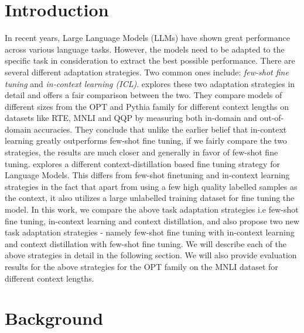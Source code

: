 \documentclass[10pt,twocolumn,letterpaper]{article}
\begin{document}
\section{Introduction}
In recent years, Large Language Models (LLMs) have shown great performance across various language tasks. However, the models need to be adapted to the specific task in consideration to extract the best possible performance. There are several different adaptation strategies. Two common ones include: \textit{few-shot fine tuning} and \textit{in-context learning (ICL)}. \cite {mosbach2023fewshot} explores these two adaptation strategies in detail and offers a fair comparison between the two. They compare models of different sizes from the OPT and Pythia family for different context lengths on datasets like RTE, MNLI and QQP by measuring both in-domain and out-of-domain accuracies. They conclude that unlike the earlier belief that in-context learning greatly outperforms few-shot fine tuning, if we fairly compare the two strategies, the results are much closer and generally in favor of few-shot fine tuning. \cite{askell2021general} explores a different context-distillation based fine tuning strategy for Language Models. This differs from few-shot finetuning and in-context learning strategies in the fact that apart from using a few high quality labelled samples as the context, it also utilizes a large unlabelled training dataset for fine tuning the model. In this work, we compare the above task adaptation strategies i.e few-shot fine tuning, in-context learning and context distillation, and also propose two new task adaptation strategies - namely few-shot fine tuning with in-context learning and context distillation with few-shot fine tuning. We will describe each of the above strategies in detail in the following section. We will also provide evaluation results for the above strategies for the OPT family on the MNLI dataset for different context lengths.

\section{Background}
\end{document}
